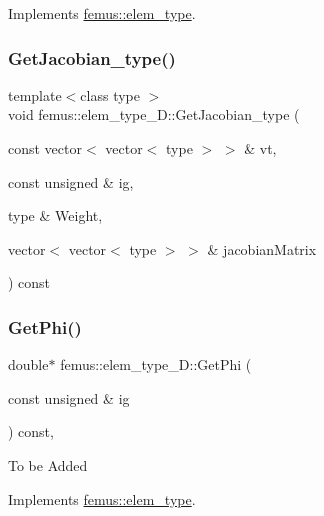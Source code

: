 Implements \mbox{\hyperlink{classfemus_1_1elem__type_a6c883b7946e55db8783fd0177546610a}{femus\+::elem\+\_\+type}}.

\mbox{\label{classfemus_1_1elem__type__3_d_adcb67b007b859b8efef1e35f52ef99c8}} 
\subsubsection{\texorpdfstring{Get\+Jacobian\+\_\+type()}{GetJacobian\_type()}}
{\footnotesize\ttfamily template$<$class type $>$ \\
void femus\+::elem\+\_\+type\+\_\+D\+::\+Get\+Jacobian\+\_\+type (\begin{DoxyParamCaption}\item[{const vector$<$ vector$<$ type $>$ $>$ \&}]{vt,  }\item[{const unsigned \&}]{ig,  }\item[{type \&}]{Weight,  }\item[{vector$<$ vector$<$ type $>$ $>$ \&}]{jacobian\+Matrix }\end{DoxyParamCaption}) const}

\mbox{\label{classfemus_1_1elem__type__3_d_ac25f62fb2b22b534172ce6ef94b89068}} 
\subsubsection{\texorpdfstring{Get\+Phi()}{GetPhi()}}
{\footnotesize\ttfamily double$\ast$ femus\+::elem\+\_\+type\+\_\+D\+::\+Get\+Phi (\begin{DoxyParamCaption}\item[{const unsigned \&}]{ig }\end{DoxyParamCaption}) const\hspace{0.3cm}{\ttfamily [inline]}, {\ttfamily [virtual]}}

To be Added 

Implements \mbox{\hyperlink{classfemus_1_1elem__type_a2aa2a37b15debbee27918f5e3f2df6b3}{femus\+::elem\+\_\+type}}.

